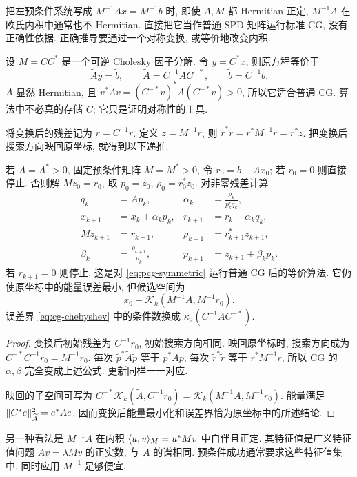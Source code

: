 把左预条件系统写成 $M^{-1}Ax=M^{-1}b$ 时, 即使 $A,M$ 都 Hermitian 正定, $M^{-1}A$ 在欧氏内积中通常也不 Hermitian. 直接把它当作普通 SPD 矩阵运行标准 CG, 没有正确性依据. 正确推导要通过一个对称变换, 或等价地改变内积.

设 $M=CC^*$ 是一个可逆 Cholesky 因子分解. 令 $y=C^*x$, 则原方程等价于
\begin{equation}\label{eq:pcg-symmetric}
\widetilde A y=\widetilde b,\qquad
\widetilde A=C^{-1}AC^{-*},\qquad\widetilde b=C^{-1}b.
\end{equation}
$\widetilde A$ 显然 Hermitian, 且 $v^*\widetilde Av=(C^{-*}v)^*A(C^{-*}v)>0$, 所以它适合普通 CG. 算法中不必真的存储 $C$; 它只是证明对称性的工具.

将变换后的残差记为 $\widetilde r=C^{-1}r$. 定义 $z=M^{-1}r$, 则
$\widetilde r^*\widetilde r=r^*M^{-1}r=r^*z$. 把变换后搜索方向映回原坐标, 就得到以下递推.

\begin{theorem}[预条件共轭梯度]\label{thm:pcg}
若 $A=A^*>0$, 固定预条件矩阵 $M=M^*>0$, 令 $r_0=b-Ax_0$; 若 $r_0=0$ 则直接停止. 否则解 $Mz_0=r_0$, 取 $p_0=z_0$, $\rho_0=r_0^*z_0$. 对非零残差计算
\begin{equation}\label{eq:pcg-algorithm}
\begin{aligned}
q_k&=Ap_k,&\alpha_k&=\frac{\rho_k}{p_k^*q_k},\\
x_{k+1}&=x_k+\alpha_kp_k,&r_{k+1}&=r_k-\alpha_kq_k,\\
Mz_{k+1}&=r_{k+1},&\rho_{k+1}&=r_{k+1}^*z_{k+1},\\
\beta_k&=\frac{\rho_{k+1}}{\rho_k},&p_{k+1}&=z_{k+1}+\beta_kp_k.
\end{aligned}
\end{equation}
若 $r_{k+1}=0$ 则停止. 这是对 \eqref{eq:pcg-symmetric} 运行普通 CG 后的等价算法. 它仍使原坐标中的能量误差最小, 但候选空间为
\[
x_0+\mathcal K_k(M^{-1}A,M^{-1}r_0).
\]
误差界 \eqref{eq:cg-chebyshev} 中的条件数换成 $\kappa_2(C^{-1}AC^{-*})$.
\end{theorem}
\begin{proof}
变换后初始残差为 $C^{-1}r_0$, 初始搜索方向相同. 映回原坐标时, 搜索方向成为 $C^{-*}C^{-1}r_0=M^{-1}r_0$. 每次 $\widetilde p^*\widetilde A\widetilde p$ 等于 $p^*Ap$, 每次 $\widetilde r^*\widetilde r$ 等于 $r^*M^{-1}r$, 所以 CG 的 $\alpha,\beta$ 完全变成上述公式. 更新同样一一对应.

映回的子空间可写为
$C^{-*}\mathcal K_k(\widetilde A,C^{-1}r_0)=\mathcal K_k(M^{-1}A,M^{-1}r_0)$. 能量满足
$\lVert C^*e\rVert_{\widetilde A}^2=e^*Ae$, 因而变换后能量最小化和误差界恰为原坐标中的所述结论.
\end{proof}
另一种看法是 $M^{-1}A$ 在内积 $\langle u,v\rangle_M=u^*Mv$ 中自伴且正定. 其特征值是广义特征值问题 $Av=\lambda Mv$ 的正实数, 与 $\widetilde A$ 的谱相同. 预条件成功通常要求这些特征值集中, 同时应用 $M^{-1}$ 足够便宜.

